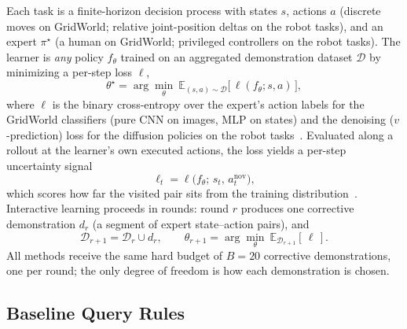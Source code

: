 \documentclass[letterpaper]{article} %
\begin{document}
Each task is a finite-horizon decision process with states $s$, actions $a$
(discrete moves on GridWorld; relative joint-position deltas on the robot
tasks), and an expert $\pi^\star$ (a human on GridWorld; privileged
controllers on the robot tasks). The learner is \emph{any}
policy $f_\theta$ trained on an aggregated demonstration dataset
$\mathcal{D}$ by minimizing a per-step loss $\ell$,
\begin{equation}
\theta^\star=\arg\min_{\theta}\
\mathbb{E}_{(s,a)\sim\mathcal{D}}\big[\,\ell(f_\theta;s,a)\,\big],
\label{eq:il}
\end{equation}
where $\ell$ is the binary cross-entropy over the expert's action labels
for the GridWorld classifiers (pure CNN on images, MLP on states) and the
denoising ($v$-prediction) loss for the diffusion policies on the robot
tasks~\citep{ho2020ddpm,chi2023diffusionpolicy}.
Evaluated along a rollout at the learner's own executed actions, the loss
yields a per-step uncertainty signal
\begin{equation}
\ell_t=\ell\big(f_\theta;\,s_t,\,a^{\mathrm{nov}}_t\big),
\label{eq:signal}
\end{equation}
which scores how far the visited pair sits from the training
distribution~\citep{lee2025diffdagger}. Interactive learning proceeds in
rounds: round $r$ produces one corrective demonstration $d_r$ (a segment of
expert state--action pairs), and
\begin{equation}
\mathcal{D}_{r+1}=\mathcal{D}_r\cup d_r,
\qquad
\theta_{r+1}=\arg\min_{\theta}\
\mathbb{E}_{\mathcal{D}_{r+1}}[\,\ell\,].
\label{eq:loop}
\end{equation}
All methods receive the same hard budget of $B{=}20$ corrective
demonstrations, one per round; the only degree of freedom is how each
demonstration is chosen.

\subsection{Baseline Query Rules}
\label{sec:unified}
\end{document}
